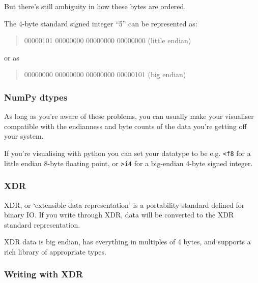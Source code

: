 But there's still ambiguity in how these bytes are ordered.

The 4-byte standard signed integer ``5'' can be represented as:

\begin{quote}
00000101 00000000 00000000 00000000 (little endian)
\end{quote}

or as

\begin{quote}
00000000 00000000 00000000 00000101 (big endian)
\end{quote}

\subsubsection{NumPy dtypes}\label{numpy-dtypes}

As long as you're aware of these problems, you can usually make your
visualiser compatible with the endianness and byte counts of the data
you're getting off your system.

If you're visualising with python you can set your datatype to be e.g.
\texttt{\textless{}f8} for a little endian 8-byte floating point, or
\texttt{\textgreater{}i4} for a big-endian 4-byte signed integer.

\subsubsection{XDR}\label{xdr}

XDR, or `extensible data representation' is a portability standard
defined for binary IO. If you write through XDR, data will be converted
to the XDR standard representation.

XDR data is big endian, has everything in multiples of 4 bytes, and
supports a rich library of appropriate types.

\subsubsection{Writing with XDR}\label{writing-with-xdr}

\begin{Shaded}
\begin{Highlighting}[]

\end{Highlighting}
\end{Shaded}

